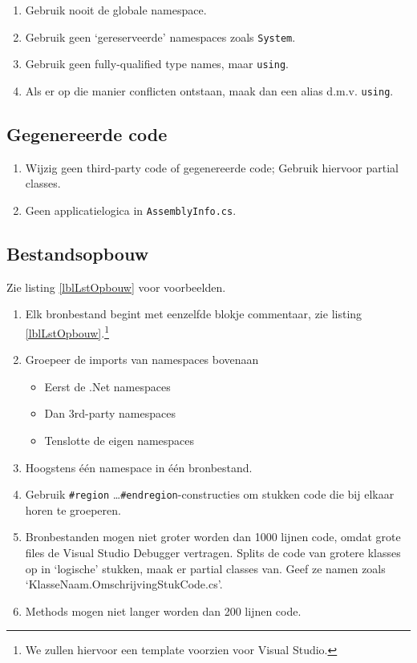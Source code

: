 \documentclass[a4paper,11pt]{article}
\newcommand{\opmerking}[1]{\marginpar{\scriptsize #1}}
\begin{document}
\begin{enumerate}[resume]
\item Gebruik nooit de globale namespace.
\item Gebruik geen `gereserveerde' namespaces zoals \lstinline !System!.
\item Gebruik geen fully-qualified type names, maar \lstinline !using!.
\item Als er op die manier conflicten ontstaan, maak dan een alias d.m.v.
\lstinline !using!.
\end{enumerate}

\subsection{Gegenereerde code}

\begin{enumerate}[resume]
\item Wijzig geen third-party code of gegenereerde code;  Gebruik hiervoor
partial classes.
\item Geen applicatielogica in \lstinline !AssemblyInfo.cs!.
\end{enumerate}

\subsection{Bestandsopbouw}
Zie listing \ref{lblLstOpbouw} voor voorbeelden.

\begin{enumerate}[resume]
\item Elk bronbestand begint met eenzelfde blokje
commentaar, zie listing \ref{lblLstOpbouw}.\opmerking{De exacte tekst
ligt nog niet vast.}\footnote{We zullen hiervoor een template voorzien
voor Visual Studio.}
\item Groepeer de imports van namespaces bovenaan
\begin{itemize}
\item Eerst de .Net namespaces
\item Dan 3rd-party namespaces
\item Tenslotte de eigen namespaces
\end{itemize}
\item Hoogstens \'e\'en namespace in \'e\'en bronbestand.
\item Gebruik \lstinline !#region! \ldots \lstinline !#endregion!-constructies om stukken code
die bij elkaar horen te groeperen.
\item Bronbestanden mogen niet groter worden dan 1000 lijnen code, omdat grote
files de
Visual Studio Debugger vertragen.  Splits de code van grotere klasses op in
`logische' stukken, maak er partial classes van.  Geef ze namen zoals
`KlasseNaam.OmschrijvingStukCode.cs'.
\item Methods mogen niet langer worden dan 200 lijnen code.
\end{enumerate}
\end{document}
